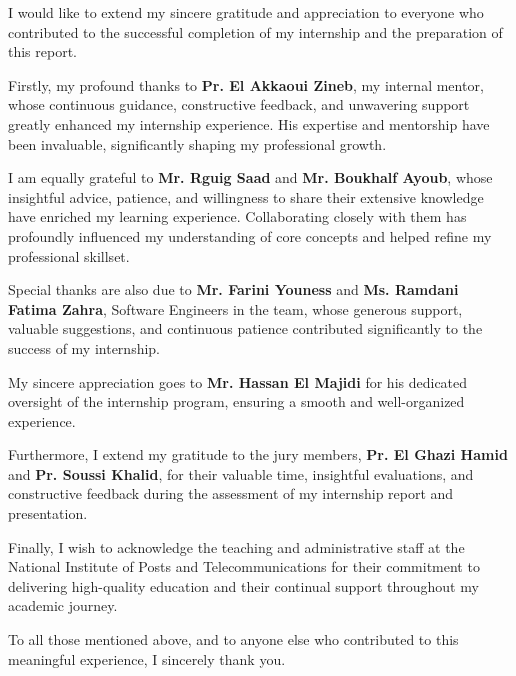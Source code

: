 I would like to extend my sincere gratitude and appreciation to everyone who contributed to the successful completion of my internship and the preparation of this report.\mynewline

Firstly, my profound thanks to \textbf{Pr. El Akkaoui Zineb}, my internal mentor, whose continuous guidance, constructive feedback, and unwavering support greatly enhanced my internship experience. His expertise and mentorship have been invaluable, significantly shaping my professional growth.

I am equally grateful to \textbf{Mr. Rguig Saad} and \textbf{Mr. Boukhalf Ayoub}, whose insightful advice, patience, and willingness to share their extensive knowledge have enriched my learning experience. Collaborating closely with them has profoundly influenced my understanding of core concepts and helped refine my professional skillset.

Special thanks are also due to \textbf{Mr. Farini Youness} and \textbf{Ms. Ramdani Fatima Zahra}, Software Engineers in the team, whose generous support, valuable suggestions, and continuous patience contributed significantly to the success of my internship.

My sincere appreciation goes to \textbf{Mr. Hassan El Majidi} for his dedicated oversight of the internship program, ensuring a smooth and well-organized experience.

Furthermore, I extend my gratitude to the jury members, \textbf{Pr. El Ghazi Hamid} and \textbf{Pr. Soussi Khalid}, for their valuable time, insightful evaluations, and constructive feedback during the assessment of my internship report and presentation.

Finally, I wish to acknowledge the teaching and administrative staff at the National Institute of Posts and Telecommunications for their commitment to delivering high-quality education and their continual support throughout my academic journey.\mynewline

To all those mentioned above, and to anyone else who contributed to this meaningful experience, I sincerely thank you.